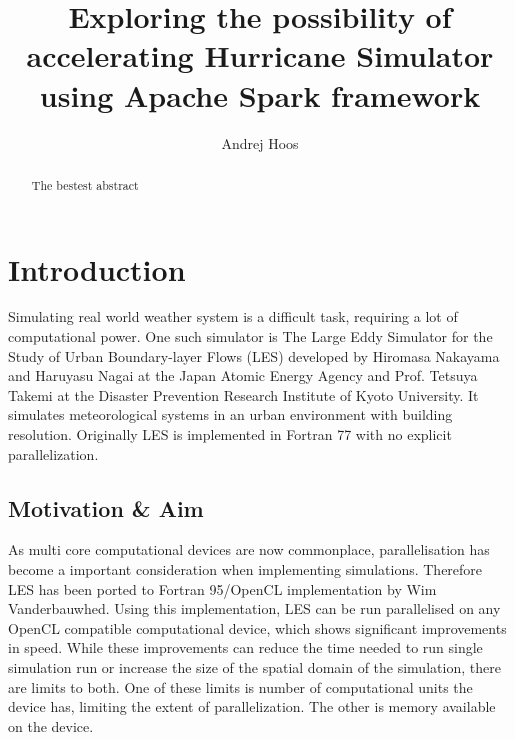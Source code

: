 \documentclass{l4proj}
\begin{document}
\title{Exploring the possibility of accelerating Hurricane Simulator \\ using Apache Spark framework}
\author{Andrej Hoos}
\maketitle

\begin{abstract}
The bestest abstract
\end{abstract}

\educationalconsent
%
%
\tableofcontents

\chapter{Introduction}

Simulating real world weather system is a difficult task, requiring a lot of computational power.
One such simulator is The Large Eddy Simulator for the Study of Urban Boundary-layer Flows (LES)
developed by  Hiromasa Nakayama and Haruyasu Nagai at the Japan Atomic Energy Agency
and Prof. Tetsuya Takemi at the Disaster Prevention Research Institute of Kyoto University\cite{les_analysis}\cite{les}.
It simulates meteorological systems in an urban environment with building resolution.
Originally LES is implemented in Fortran 77 with no explicit parallelization.

\section{Motivation \& Aim}

As multi core computational devices are now commonplace, parallelisation has become
a important consideration when implementing simulations. Therefore LES has been
ported to Fortran 95/OpenCL implementation by Wim Vanderbauwhed\cite{les_wim}. Using this implementation,
LES can be run parallelised on any OpenCL compatible computational device, which shows
significant improvements in speed. While these improvements can reduce the time needed to
run single simulation run or increase the size of the spatial domain of the simulation,
there are limits to both. One of these limits is number of computational units the device has,
limiting the extent of parallelization. The other is memory available on the device.
\end{document}
